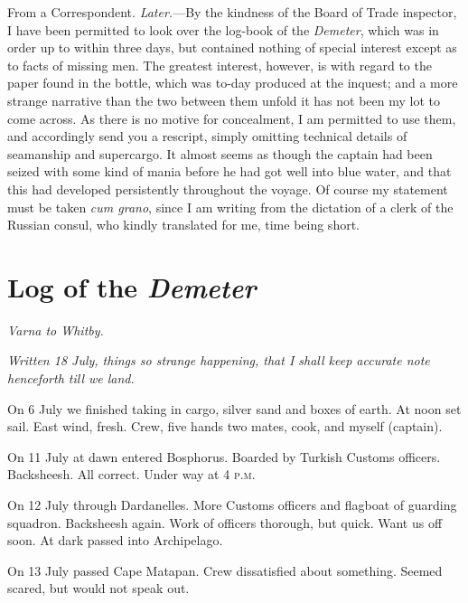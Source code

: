 \begin{newspaper}{}{From a Correspondent.}
\noindent\textit{Later.}—By the kindness of the Board of Trade inspector, I have been permitted to look over the log-book of the \textit{Demeter}, which was in order up to within three days, but contained nothing of special interest except as to facts of missing men. The greatest interest, however, is with regard to the paper found in the bottle, which was to-day produced at the inquest; and a more strange narrative than the two between them unfold it has not been my lot to come across. As there is no motive for concealment, I am permitted to use them, and accordingly send you a rescript, simply omitting technical details of seamanship and supercargo. It almost seems as though the captain had been seized with some kind of mania before he had got well into blue water, and that this had developed persistently throughout the voyage. Of course my statement must be taken \textit{cum grano}, since I am writing from the dictation of a clerk of the Russian consul, who kindly translated for me, time being short.
\end{newspaper}

\section{Log of the \textit{Demeter}}

\begin{center}\textit{Varna to Whitby.}\end{center}

\textit{Written 18 July, things so strange happening, that I shall keep accurate note henceforth till we land.}

 

On 6 July we finished taking in cargo, silver sand and boxes of earth. At noon set sail. East wind, fresh. Crew, five hands \textellipsis two mates, cook, and myself (captain).

 

On 11 July at dawn entered Bosphorus. Boarded by Turkish Customs officers. Backsheesh. All correct. Under way at 4 \textsc{p.m.}

 

On 12 July through Dardanelles. More Customs officers and flagboat of guarding squadron. Backsheesh again. Work of officers thorough, but quick. Want us off soon. At dark passed into Archipelago.

 

On 13 July passed Cape Matapan. Crew dissatisfied about something. Seemed scared, but would not speak out.

